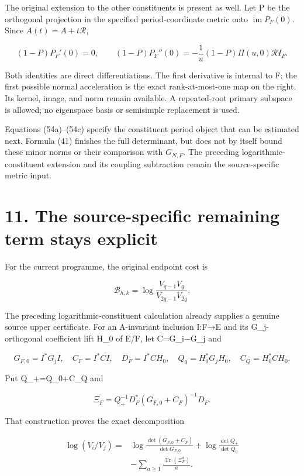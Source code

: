 \documentclass[
  11pt,
]{article}
\begin{document}
The original extension to the other constituents is present as well. Let
P be the orthogonal projection in the specified period-coordinate metric
onto \(\operatorname{im}P_F(0)\). Since \(A(t)=A+t\mathcal R\),

\[
\boxed{(1-P)P_F'(0)=0,\qquad
(1-P)P_F''(0)=-\frac1u(1-P)\Pi(u,0)\mathcal R I_F.}
\tag{54c}
\]

Both identities are direct differentiations. The first derivative is
internal to F; the first possible normal acceleration is the exact
rank-at-most-one map on the right. Its kernel, image, and norm remain
available. A repeated-root primary subspace is allowed; no eigenspace
basis or semisimple replacement is used.

Equations (54a)--(54c) specify the constituent period object that can be
estimated next. Formula (41) finishes the full determinant, but does not
by itself bound these minor norms or their comparison with \(G_{N,F}\).
The preceding logarithmic-constituent extension and its coupling
subtraction remain the source-specific metric input.

\section{11. The source-specific remaining term stays
explicit}\label{the-source-specific-remaining-term-stays-explicit}

For the current programme, the original endpoint cost is

\[
\mathcal B_{h,k}
 =\log\frac{V_{q-1}V_q}{V_{2q-1}V_{2q}}.
\tag{55}
\]

The preceding logarithmic-constituent calculation already supplies a
genuine source upper certificate. For an A-invariant inclusion I:F→E and
its G\_j-orthogonal coefficient lift H\_0 of E/F, let C=G\_i−G\_j and

\[
G_{F,0}=I^*G_jI,\quad C_F=I^*CI,\quad
D_F=I^*CH_0,\quad Q_0=H_0^*G_jH_0,\quad C_Q=H_0^*CH_0.
\tag{56}
\]

Put Q\_+=Q\_0+C\_Q and

\[
\Xi_F=Q_+^{-1}D_F^*(G_{F,0}+C_F)^{-1}D_F.
\tag{57}
\]

That construction proves the exact decomposition

\[
\begin{aligned}
\log(V_i/V_j)
={}&\log\frac{\det(G_{F,0}+C_F)}{\det G_{F,0}}
 +\log\frac{\det Q_+}{\det Q_0}\\
&-\sum_{a\ge1}\frac{\operatorname{Tr}(\Xi_F^a)}a.
\end{aligned}
\tag{58}
\]
\end{document}
